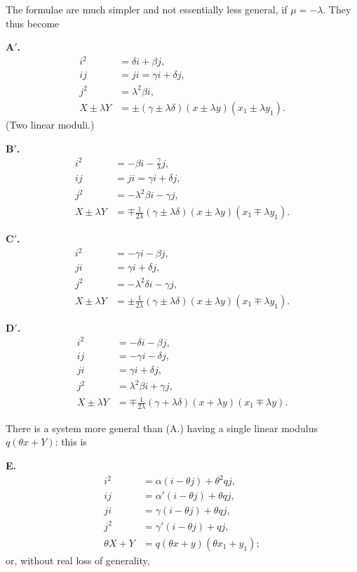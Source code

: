 \documentclass[12pt,a4paper]{article}
\begin{document}
The formulae are much simpler and not essentially less general, if $\mu = -\lambda$. They thus become

\medskip
\textbf{A$'$.}
\begin{align*}
i^2 &= \delta i + \beta j,\\
ij &= ji = \gamma i + \delta j,\\
j^2 &= \lambda^2\beta i,\\
X \pm \lambda Y &= \pm(\gamma \pm \lambda\delta)(x \pm \lambda y)(x_1 \pm \lambda y_1).
\end{align*}
(Two linear moduli.)

\medskip
\textbf{B$'$.}
\begin{align*}
i^2 &= -\beta i - \tfrac{\gamma}{\lambda}j,\\
ij &= ji = \gamma i + \delta j,\\
j^2 &= -\lambda^2\beta i - \gamma j,\\
X \pm \lambda Y &= \mp\tfrac{1}{2\lambda}(\gamma \pm \lambda\delta)(x \pm \lambda y)(x_1 \mp \lambda y_1).
\end{align*}

\medskip
\textbf{C$'$.}
\begin{align*}
i^2 &= -\gamma i - \beta j,\\
ji &= \gamma i + \delta j,\\
j^2 &= -\lambda^2\delta i - \gamma j,\\
X \pm \lambda Y &= \pm\tfrac{1}{2\lambda}(\gamma \pm \lambda\delta)(x \pm \lambda y)(x_1 \mp \lambda y_1).
\end{align*}

\medskip
\textbf{D$'$.}
\begin{align*}
i^2 &= -\delta i - \beta j,\\
ij &= -\gamma i - \delta j,\\
ji &= \gamma i + \delta j,\\
j^2 &= \lambda^2\beta i + \gamma j,\\
X \pm \lambda Y &= \mp\tfrac{1}{2\lambda}(\gamma + \lambda\delta)(x + \lambda y)(x_1 \mp \lambda y).
\end{align*}

There is a system more general than (A.) having a single linear modulus $q(\theta x + Y)$: this is

\medskip
\textbf{E.}
\begin{align*}
i^2 &= \alpha(i - \theta j) + \theta^2 q j,\\
ij &= \alpha'(i - \theta j) + \theta q j,\\
ji &= \gamma(i - \theta j) + \theta q j,\\
j^2 &= \gamma'(i - \theta j) + q j,\\
\theta X + Y &= q(\theta x + y)(\theta x_1 + y_1);
\end{align*}
or, without real loss of generality,
\end{document}
